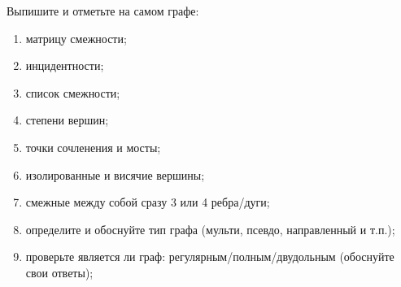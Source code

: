 \question
Выпишите и отметьте на самом графе:
\begin{enumerate}
\item   матрицу смежности;
\item   инцидентности;
\item   список смежности;
\item   степени вершин;
\item   точки сочленения и мосты;
\item   изолированные и висячие вершины;
\item   смежные между собой сразу 3 или 4  ребра/дуги;
\item   определите и обоснуйте тип графа (мульти, псевдо, направленный и т.п.);
\item   проверьте является ли граф: регулярным/полным/двудольным (обоснуйте свои ответы);
\end{enumerate}
\begin{figure}[h]

\begin{minipage}[h]{0.55\linewidth}
\end{minipage}
\begin{minipage}[h]{0.45\linewidth}
\end{minipage}
\end{figure}
